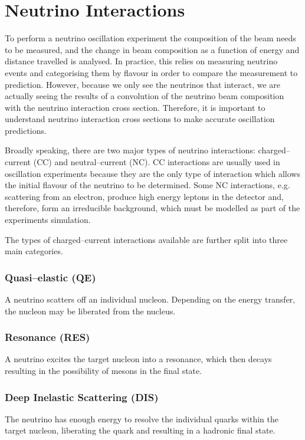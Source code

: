 \section{Neutrino Interactions} \label{nu_prod}

To perform a neutrino oscillation experiment the composition of the beam needs
to be measured, and the change in beam composition as a function of energy and
distance travelled is analysed. In practice, this relies on measuring
neutrino events and categorising them by flavour in order to compare the
measurement to prediction. However, because we only see the neutrinos that
interact, we are actually seeing the results of a convolution of the neutrino
beam composition with the neutrino interaction cross section. Therefore, it is
important to understand neutrino interaction cross sections to make accurate 
oscillation predictions.

Broadly speaking, there are two major types of neutrino interactions:
charged--current (CC) and neutral--current (NC). CC interactions are usually 
used in oscillation experiments because they are the only type of interaction 
which allows the initial flavour of the neutrino to be determined. Some 
NC interactions, e.g. scattering from an electron, produce high energy leptons 
in the detector and, therefore, form an irreducible background, which must 
be modelled as part of the experiments simulation.

The types of charged--current interactions available are further split into 
three main categories.

\subsubsection*{Quasi--elastic (QE)}
A neutrino scatters off an individual nucleon. Depending on the energy 
transfer, the nucleon may be liberated from the nucleus.
\subsubsection*{Resonance (RES)}
A neutrino excites the target nucleon into a resonance, which then decays
resulting in the possibility of mesons in the final state.
\subsubsection*{Deep Inelastic Scattering (DIS)}
The neutrino has enough energy to resolve the individual quarks within the
target nucleon, liberating the quark and resulting in a hadronic final state.

